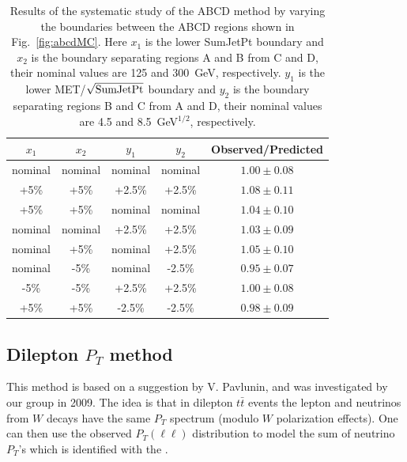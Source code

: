 \begin{table}[ht]
\begin{center}
\caption{\label{tab:abcdsyst} 
Results of the systematic study of the ABCD method by varying the boundaries
between the ABCD regions shown in Fig.~\ref{fig:abcdMC}. Here $x_1$ is the lower SumJetPt boundary and 
$x_2$ is the boundary separating regions A and B from C and D, their nominal values are 125 and 300~GeV,
respectively. $y_1$ is the lower MET/$\sqrt{\rm SumJetPt}$ boundary and 
$y_2$ is the boundary separating regions B and C from A and D, their nominal values are 4.5 and 8.5~GeV$^{1/2}$,
respectively.}
\begin{tabular}{cccc|c}
\hline
$x_1$   &   $x_2$ & $y_1$   &   $y_2$ & Observed/Predicted \\
\hline

nominal & nominal & nominal & nominal & $1.00 \pm 0.08$    \\

+5\%    & +5\%    & +2.5\%  & +2.5\%  & $1.08 \pm 0.11$    \\

+5\%    & +5\%    & nominal & nominal & $1.04 \pm 0.10$    \\

nominal & nominal & +2.5\%  & +2.5\%  & $1.03 \pm 0.09$    \\

nominal & +5\%    & nominal & +2.5\%  & $1.05 \pm 0.10$    \\

nominal & -5\%    & nominal & -2.5\%  & $0.95 \pm 0.07$    \\

-5\%    & -5\%    & +2.5\%  & +2.5\%  & $1.00 \pm 0.08$    \\

+5\%    & +5\%    & -2.5\%  & -2.5\%  & $0.98 \pm 0.09$    \\
\hline
\end{tabular}
\end{center}
\end{table}


\clearpage

\subsection{Dilepton $P_T$ method}
\label{sec:victory}
This method is based on a suggestion by V. Pavlunin\cite{ref:victory},
and was investigated by our group in 2009\cite{ref:ourvictory}.
The idea is that in dilepton $t\bar{t}$ events the lepton and neutrinos
from $W$ decays have the same $P_T$ spectrum (modulo $W$ polarization 
effects).  One can then use the observed 
$P_T(\ell\ell)$ distribution to model the sum of neutrino $P_T$'s which 
is identified with the \met.

